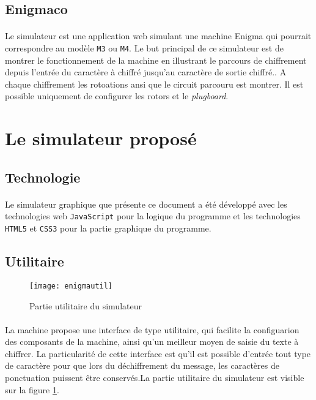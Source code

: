 \documentclass[letterpaper]{article}
\begin{document}
\subsection{Enigmaco}

\paragraph{}

Le simulateur \cite{ECO} est une application web simulant une machine Enigma qui pourrait correspondre au modèle \texttt{M3} ou \texttt{M4}. Le but principal de ce simulateur est de montrer le fonctionnement de la machine en illustrant le parcours de chiffrement depuis l'entrée du caractère à chiffré jusqu'au caractère de sortie chiffré.. A chaque chiffrement les rotoations ansi que le circuit parcouru est montrer. Il est possible uniquement de configurer les rotors et le \textit{plugboard}.



\section{Le simulateur proposé}

\subsection{Technologie}

\paragraph{}
Le simulateur graphique que présente ce document a été développé avec les technologies web \texttt{JavaScript} pour la logique du programme et les technologies \texttt{HTML5} et \texttt{CSS3} pour la partie graphique du programme.

\subsection{Utilitaire}

\begin{figure}
    \centering
    \texttt{[image: enigmautil]}
    \caption{Partie utilitaire du simulateur}
    \label{fig:enigmautil}
\end{figure}

\paragraph{}
La machine propose une interface de type utilitaire, qui facilite la configuarion des composants de la machine, ainsi qu'un meilleur moyen de saisie du texte à chiffrer. La particularité de cette interface est qu'il est possible d'entrée tout type de caractère pour que lors du déchiffrement du message, les caractères de ponctuation puissent être conservés.La partie utilitaire du simulateur est visible sur la figure \ref{fig:enigmautil}.
\end{document}
